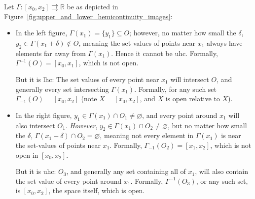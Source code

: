 \documentclass{article}
\newcommand{\toto}{\rightrightarrows}
\theoremstyle{mythm}
\theoremstyle{mydef}
\begin{document}
\begin{figure}[!ht]
\end{figure}

Let $\Gamma: [x_0, x_2] \toto \mathbb{R}$ be as depicted in Figure~\ref{fig:upper_and_lower_hemicontinuity_images}:
\begin{itemize}
  \item In the left figure, $\Gamma(x_1) = \{y_1\} \subseteq O$; however, no matter how small the $\delta$, $y_2 \in \Gamma(x_1 + \delta) \notin O$, meaning the set values of points near $x_1$ always have elements far away from $\Gamma(x_1)$. Hence it cannot be uhc. Formally, $\Gamma^{-1}(O) = [x_0, x_1]$, which is not open.

    But it is lhc: The set values of every point near $x_1$ will intersect $O$, and generally every set intersecting $\Gamma(x_1)$. Formally, for any such set $\Gamma_{-1}(O) = [x_0, x_2]$ (note $X = [x_0, x_2]$, and $X$ is open relative to $X$).

  \item In the right figure, $y_1 \in \Gamma(x_1) \cap O_1 \ne \varnothing$, and every point around $x_1$ will also intersect $O_1$. \textit{However}, $y_2 \in \Gamma(x_1) \cap O_2 \ne \varnothing$, but no matter how small the $\delta$, $\Gamma(x_1 - \delta) \cap O_2 = \varnothing$, meaning not every element in $\Gamma(x_1)$ is near the set-values of points near $x_1$. Formally, $\Gamma_{-1}(O_2) = [x_1, x_2]$, which is not open in $[x_0, x_2]$.

    But it is uhc: $O_3$, and generally any set containing all of $x_1$, will also contain the set value of every point around $x_1$. Formally, $\Gamma^{-1}(O_3)$, or any such set, is $[x_0, x_2]$, the space itself, which is open.
\end{itemize}
\end{document}
